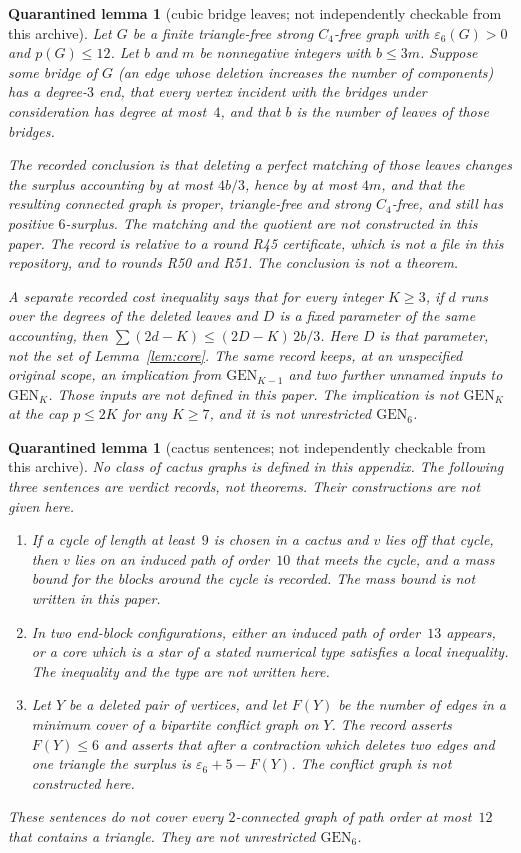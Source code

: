 \documentclass[11pt]{amsart}
\newtheorem{qlemma}[theorem]{Quarantined lemma}
\theoremstyle{definition}
\theoremstyle{remark}
\newcommand{\pp}{p}
\newcommand{\GEN}{\mathrm{GEN}}
\begin{document}
\begin{qlemma}[cubic bridge leaves; not independently checkable from this archive]\label{lem:cubic}
Let $G$ be a finite triangle-free strong $C_4$-free graph with $\varepsilon_6(G)>0$ and $\pp(G)\le 12$. Let $b$ and $m$ be nonnegative integers with $b\le 3m$. Suppose some bridge of $G$ (an edge whose deletion increases the number of components) has a degree-$3$ end, that every vertex incident with the bridges under consideration has degree at most~$4$, and that $b$ is the number of leaves of those bridges.

The recorded conclusion is that deleting a perfect matching of those leaves changes the surplus accounting by at most $4b/3$, hence by at most $4m$, and that the resulting connected graph is proper, triangle-free and strong $C_4$-free, and still has positive $6$-surplus. The matching and the quotient are not constructed in this paper. The record is relative to a round R45 certificate, which is not a file in this repository, and to rounds R50 and R51. The conclusion is not a theorem.

A separate recorded cost inequality says that for every integer $K\ge 3$, if $d$ runs over the degrees of the deleted leaves and $D$ is a fixed parameter of the same accounting, then $\sum(2d-K)\le(2D-K)\,2b/3$. Here $D$ is that parameter, not the set of Lemma~\ref{lem:core}. The same record keeps, at an unspecified original scope, an implication from $\GEN_{K-1}$ and two further unnamed inputs to $\GEN_K$. Those inputs are not defined in this paper. The implication is not $\GEN_K$ at the cap $\pp\le 2K$ for any $K\ge 7$, and it is not unrestricted $\GEN_6$.
\end{qlemma}

\begin{qlemma}[cactus sentences; not independently checkable from this archive]\label{lem:cactus}
No class of cactus graphs is defined in this appendix. The following three sentences are verdict records, not theorems. Their constructions are not given here.
\begin{enumerate}
\item If a cycle of length at least~$9$ is chosen in a cactus and $v$ lies off that cycle, then $v$ lies on an induced path of order~$10$ that meets the cycle, and a mass bound for the blocks around the cycle is recorded. The mass bound is not written in this paper.
\item In two end-block configurations, either an induced path of order~$13$ appears, or a core which is a star of a stated numerical type satisfies a local inequality. The inequality and the type are not written here.
\item Let $Y$ be a deleted pair of vertices, and let $F(Y)$ be the number of edges in a minimum cover of a bipartite conflict graph on $Y$. The record asserts $F(Y)\le 6$ and asserts that after a contraction which deletes two edges and one triangle the surplus is $\varepsilon_6+5-F(Y)$. The conflict graph is not constructed here.
\end{enumerate}
These sentences do not cover every $2$-connected graph of path order at most~$12$ that contains a triangle. They are not unrestricted $\GEN_6$.
\end{qlemma}
\end{document}
